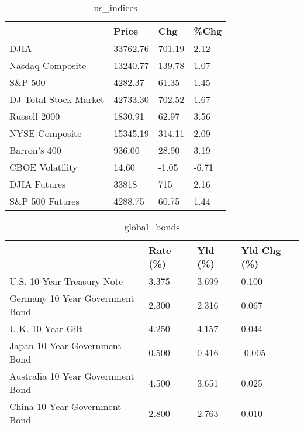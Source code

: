 \documentclass{article}%
\begin{document}
%


\begin{table}[htbp]%
\caption{us\_indices}%
\centering%
\begin{adjustbox}{width=1\textwidth}%
\begin{tabular}{llll}
\toprule
                      &    Price &    Chg &  \%Chg \\
\midrule
                 DJIA & 33762.76 & 701.19 &  2.12 \\
     Nasdaq Composite & 13240.77 & 139.78 &  1.07 \\
              S\&P 500 &  4282.37 &  61.35 &  1.45 \\
DJ Total Stock Market & 42733.30 & 702.52 &  1.67 \\
         Russell 2000 &  1830.91 &  62.97 &  3.56 \\
       NYSE Composite & 15345.19 & 314.11 &  2.09 \\
         Barron's 400 &   936.00 &  28.90 &  3.19 \\
      CBOE Volatility &    14.60 &  -1.05 & -6.71 \\
         DJIA Futures &    33818 &    715 &  2.16 \\
      S\&P 500 Futures &  4288.75 &  60.75 &  1.44 \\
\bottomrule
\end{tabular}
%
\end{adjustbox}%
\end{table}

%


\begin{table}[htbp]%
\caption{global\_bonds}%
\centering%
\begin{adjustbox}{width=1\textwidth}%
\begin{tabular}{llll}
\toprule
                                  & Rate (\%) & Yld (\%) & Yld Chg (\%) \\
\midrule
       U.S. 10 Year Treasury Note &    3.375 &   3.699 &       0.100 \\
  Germany 10 Year Government Bond &    2.300 &   2.316 &       0.067 \\
                U.K. 10 Year Gilt &    4.250 &   4.157 &       0.044 \\
    Japan 10 Year Government Bond &    0.500 &   0.416 &      -0.005 \\
Australia 10 Year Government Bond &    4.500 &   3.651 &       0.025 \\
    China 10 Year Government Bond &    2.800 &   2.763 &       0.010 \\
\bottomrule
\end{tabular}
%
\end{adjustbox}%
\end{table}
\end{document}
